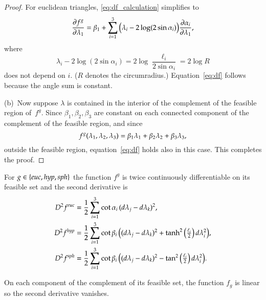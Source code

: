 \documentclass[Thesis]{subfiles}
\begin{document}
\begin{proof}
  For euclidean triangles, \eqref{eq:df_calculation} simplifies to
  \begin{equation*}
    \frac{\partial f^{g}}{\partial\lambda_{1}}
    =
    \beta_{1} + \sum_{i=1}^{3}
    \big(\lambda_{i} - 2\log(2\sin\alpha_{i})\big)
    \frac{\partial\alpha_{i}}{\partial\lambda_{1}},
  \end{equation*}  
  where
  \begin{equation*}
    \lambda_{i}-2\log(2\sin\alpha_{i})=2\log\frac{\ell_{i}}{2\sin\alpha_{i}}
    =2\log R
  \end{equation*}
  does not depend on $i$. ($R$ denotes the circumradius.)
  Equation~\eqref{eq:df} follows because the angle sum is constant.

  (b)\, Now suppose $\lambda$ is contained in the interior of the complement of
  the feasible region of~$f^{g}$. Since
  $\beta_{1},\beta_{2},\beta_{3}$ are constant on each connected
  component of the complement of the feasible region, and since
  \begin{equation*}
    f^{g}(\lambda_{1}, \lambda_{2}, \lambda_{3}) 
    = \beta_{1} \lambda_{1} 
    + \beta_{2} \lambda_{2} 
    + \beta_{3} \lambda_{3},
  \end{equation*}
  outside the feasible region, equation~\ref{eq:df} holds also in
  this case. This completes the proof.
\end{proof}

\begin{proposition}
  \label{prop:ddf}
  For $\g\in\{\euc,\hyp,\sph\}$ the function $f^{g}$ is twice
  continuously differentiable on its feasible set and
  the second derivative is 
  \begin{align}
    \label{eq:ddf_euc}
    D^{2}f^{\euc} &= 
    \frac{1}{2}\sum_{i=1}^{3} \cot\alpha_{i}\,
    (d\lambda_{j}-d\lambda_{k})^{2},\\
    \label{eq:ddf_hyp}
    D^{2}f^{\hyp} &=
    \frac{1}{2}\sum_{i=1}^{3} \cot\beta_{i}\,
    \big(
    (d\lambda_{j}-d\lambda_{k})^{2}
    +\tanh^{2}\big(
    \tfrac{\ell_{i}}{2}
    \big)\,
    d\lambda_{i}^{2}
    \big),\\
    \label{eq:ddf_sph}
    D^{2}f^{\sph} &=
    \frac{1}{2}\sum_{i=1}^{3} \cot\beta_{i}\,
    \big(
    (d\lambda_{j}-d\lambda_{k})^{2}
    -\tan^{2}\big(
    \tfrac{\ell_{i}}{2}
    \big)\,
    d\lambda_{i}^{2}
    \big).
  \end{align}
  
  On each component of the complement of its feasible set, the
  function $f_{g}$ is linear so the second derivative vanishes.
\end{proposition}
\end{document}
